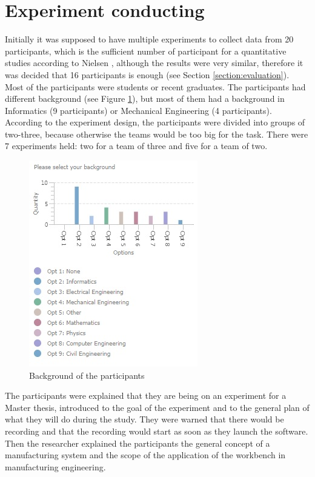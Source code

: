 \section{Experiment conducting}\label{section:experiment_conducting}

Initially it was supposed to have multiple experiments to collect data from 20 participants, which is the sufficient number of participant for a quantitative studies according to Nielsen \cite{nielsen}, although the results were very similar, therefore it was decided that 16 participants is enough (see Section \ref{section:evaluation}). Most of the participants were students or recent graduates. The participants had different background (see Figure \ref{fig:background}), but most of them had a background in Informatics (9 participants) or Mechanical Engineering (4 participants). According to the experiment design, the participants were divided into groups of two-three, because otherwise the teams would be too big for the task. There were 7 experiments held: two for a team of three and five for a team of two.\\

\begin{figure}[htb]
 \centering
\includegraphics{figures/background.jpg}
\caption{Background of the participants}
\label{fig:background}
\end{figure}

The participants were explained that they are being on an experiment for a Master thesis, introduced to the goal of the experiment and to the general plan of what they will do during the study. They were warned that there would be recording and that the recording would start as soon as they launch the software. Then the researcher explained the participants the general concept of a manufacturing system and the scope of the application of the workbench in manufacturing engineering.\\

